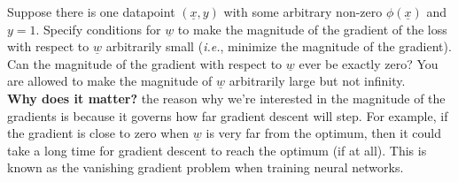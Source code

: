 \documentclass{article}
\renewcommand{\vec}[1]{\underline{#1}}
\newcommand{\vecw}{\vec{w}}
\theoremstyle{definition}
\newtheorem*{answer}{Answer}
\begin{document}
\begin{question}
\begin{question}
		\item Suppose there is one datapoint $(\underline{x},y)$ with some arbitrary non-zero $\phi(\underline{x})$ and $y=1$. Specify conditions for $\underline{w}$ to make the magnitude of the gradient of the loss with respect to $\underline{w}$ arbitrarily small (\textit{i.e.}, minimize the magnitude of the gradient). Can the magnitude of the gradient with respect to $\underline{w}$ ever be exactly zero? You are allowed to make the magnitude of $\underline{w}$ arbitrarily large but not infinity.\\
		
		\textbf{Why does it matter?} the reason why we're interested in the magnitude of the gradients is because it governs how far gradient descent will step. For example, if the gradient is close to zero when $\underline{w}$ is very far from the optimum, then it could take a long time for gradient descent to reach the optimum (if at all). This is known as the vanishing gradient problem when training neural networks.
		
%			
	\end{question}
\end{question}
\end{document}
